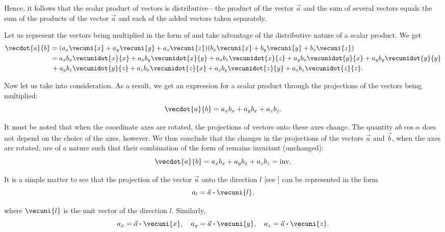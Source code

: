 \noindent
Hence, it follows that the scalar product of vectors is distributive---the product of the vector $\vec{a}$ and the sum of several vectors equals the sum of the products of the vector $\vec{a}$ and each of the added vectors taken separately.

Let us represent the vectors being multiplied in the form of  and take advantage of the distributive nature of a scalar product. We get
\begin{align*}
\vecdot{a}{b} &= (a_x\vecuni{x} + a_y\vecuni{y} + a_z\vecuni{z})(b_x\vecuni{x} + b_y\vecuni{y} + b_z\vecuni{z})\\
&= a_xb_x\vecunidot{x}{x} + a_xb_y\vecunidot{x}{y} + a_xb_z\vecunidot{x}{z} + a_yb_x\vecunidot{y}{x} + a_yb_y\vecunidot{y}{y}\\
&\,+ a_yb_z\vecunidot{y}{z}+ a_zb_x\vecunidot{z}{x} + a_zb_y\vecunidot{z}{y} + a_zb_z\vecunidot{z}{z}.
\end{align*}

\noindent
Now let us take  into consideration. As a result, we get an expression for a scalar product through the projections of the vectors being multiplied:
\begin{equation}\label{eq:1_23}
\vecdot{a}{b} = a_xb_x + a_yb_x + a_zb_z.
\end{equation}

\noindent
It must be noted that when the coordinate axes are rotated, the projections of vectors onto these axes change. The quantity $ab\cos\alpha$ does not depend on the choice of the axes, however. We thus conclude that the changes in the projections of the vectors $\vec{a}$ and $\vec{b}$, when the axes are rotated, are of a nature such that their combination of the form of  remains invariant (unchanged):
\begin{equation}\label{eq:1_24}
\vecdot{a}{b} = a_xb_x + a_yb_x + a_zb_z = \mathrm{inv}.
\end{equation}

It is a simple matter to see that the projection of the vector $\vec{a}$ onto the direction $l$ [see ] can be represented in the form
\begin{equation}\label{eq:1_25}
a_l = \vec{a}\boldsymbol{\cdot}\vecuni{l},
\end{equation}

\noindent
where $\vecuni{l}$ is the unit vector of the direction $l$. Similarly,
\begin{equation}\label{eq:1_26}
a_x = \vec{a}\boldsymbol{\cdot}\vecuni{x},\quad  a_y = \vec{a}\boldsymbol{\cdot}\vecuni{y}, \quad  a_z=\vec{a}\boldsymbol{\cdot}\vecuni{z}.
\end{equation}

